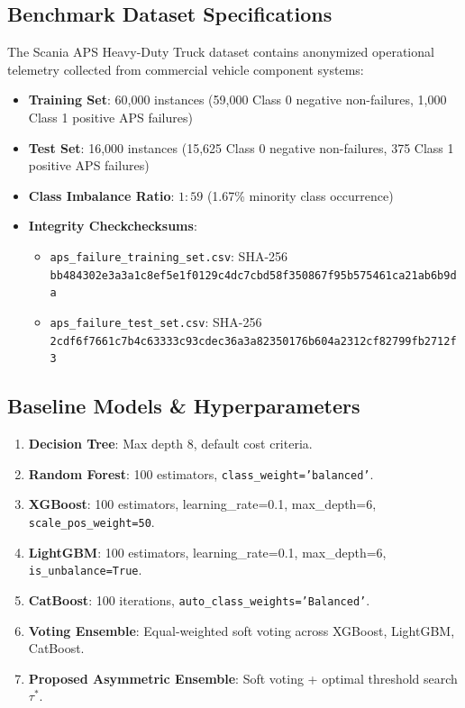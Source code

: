 \documentclass[conference]{IEEEtran}
\begin{document}
\subsection{Benchmark Dataset Specifications}
The Scania APS Heavy-Duty Truck dataset contains anonymized operational telemetry collected from commercial vehicle component systems:
\begin{itemize}
    \item \textbf{Training Set}: 60,000 instances (59,000 Class 0 negative non-failures, 1,000 Class 1 positive APS failures)
    \item \textbf{Test Set}: 16,000 instances (15,625 Class 0 negative non-failures, 375 Class 1 positive APS failures)
    \item \textbf{Class Imbalance Ratio}: $1:59$ (1.67\% minority class occurrence)
    \item \textbf{Integrity Checkchecksums}:
    \begin{itemize}
        \item \texttt{aps\_failure\_training\_set.csv}: SHA-256 \texttt{bb484302e3a3a1c8ef5e1f0129c4dc7cbd58f350867f95b575461ca21ab6b9da}
        \item \texttt{aps\_failure\_test\_set.csv}: SHA-256 \texttt{2cdf6f7661c7b4c63333c93cdec36a3a82350176b604a2312cf82799fb2712f3}
    \end{itemize}
\end{itemize}

\subsection{Baseline Models \& Hyperparameters}
\begin{enumerate}
    \item \textbf{Decision Tree}: Max depth 8, default cost criteria.
    \item \textbf{Random Forest}: 100 estimators, \texttt{class\_weight='balanced'}.
    \item \textbf{XGBoost}: 100 estimators, learning\_rate=0.1, max\_depth=6, \texttt{scale\_pos\_weight=50}.
    \item \textbf{LightGBM}: 100 estimators, learning\_rate=0.1, max\_depth=6, \texttt{is\_unbalance=True}.
    \item \textbf{CatBoost}: 100 iterations, \texttt{auto\_class\_weights='Balanced'}.
    \item \textbf{Voting Ensemble}: Equal-weighted soft voting across XGBoost, LightGBM, CatBoost.
    \item \textbf{Proposed Asymmetric Ensemble}: Soft voting + optimal threshold search $\tau^*$.
\end{enumerate}
\end{document}
